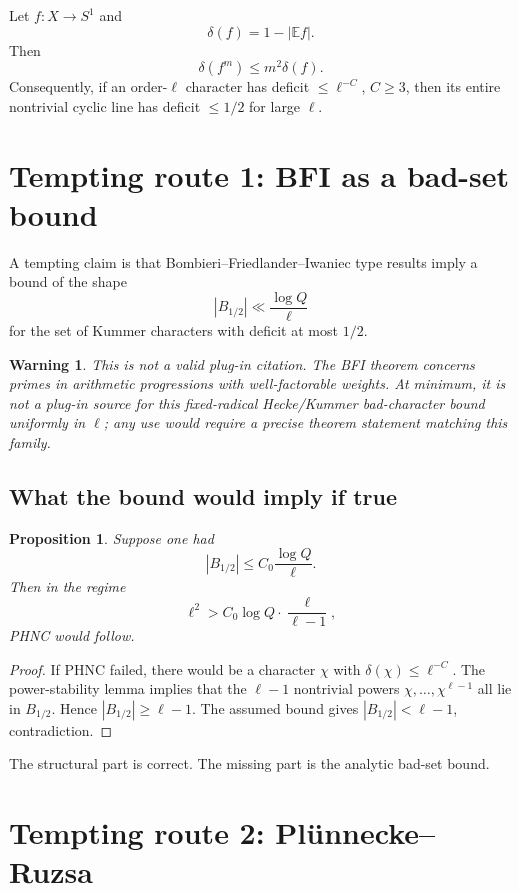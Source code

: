 \documentclass[11pt]{article}
\newtheorem{proposition}{Proposition}
\newtheorem{warning}{Warning}
\newcommand{\E}{\mathbb E}
\newcommand{\1}{\mathbf 1}
\begin{document}
Let \(f:X\to S^1\) and
\[
\delta(f)=1-|\E f|.
\]
Then
\[
\delta(f^m)\le m^2\delta(f).
\]
Consequently, if an order-\(\ell\) character has deficit \(\le\ell^{-C}\), \(C\ge3\), then its entire nontrivial cyclic line has deficit \(\le1/2\) for large \(\ell\).

\section{Tempting route 1: BFI as a bad-set bound}

A tempting claim is that Bombieri--Friedlander--Iwaniec type results imply a bound of the shape
\[
|B_{1/2}|\ll \frac{\log Q}{\ell}
\]
for the set of Kummer characters with deficit at most \(1/2\).

\begin{warning}
This is not a valid plug-in citation.  The BFI theorem concerns primes in arithmetic progressions with well-factorable weights.  At minimum, it is not a plug-in source for this fixed-radical Hecke/Kummer bad-character bound uniformly in \(\ell\); any use would require a precise theorem statement matching this family.
\end{warning}

\subsection{What the bound would imply if true}

\begin{proposition}
Suppose one had
\[
|B_{1/2}|\le C_0\frac{\log Q}{\ell}.
\]
Then in the regime
\[
\ell^2>C_0\log Q\cdot\frac{\ell}{\ell-1},
\]
PHNC would follow.
\end{proposition}

\begin{proof}
If PHNC failed, there would be a character \(\chi\) with \(\delta(\chi)\le\ell^{-C}\).  The power-stability lemma implies that the \(\ell-1\) nontrivial powers \(\chi,\dots,\chi^{\ell-1}\) all lie in \(B_{1/2}\).  Hence \(|B_{1/2}|\ge\ell-1\).  The assumed bound gives \(|B_{1/2}|<\ell-1\), contradiction.
\end{proof}

The structural part is correct.  The missing part is the analytic bad-set bound.

\section{Tempting route 2: Pl\"unnecke--Ruzsa}
\end{document}
